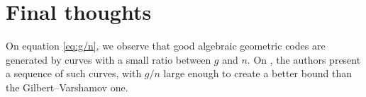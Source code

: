\documentclass[11pt, oneside]{amsart}
\theoremstyle{definition}
\theoremstyle{remark}
\numberwithin{equation}{section}
\begin{document}
\section{Final thoughts}\label{s:tvz}

On equation \eqref{eq:g/n}, we observe that good algebraic geometric codes are generated by curves with a small ratio between $g$ and $n$.
On \cite{TVZ82}, 
the authors present a sequence of such curves, with $g/n$ large enough to create a better bound than the Gilbert--Varshamov one.

\printbibliography
\end{document}
